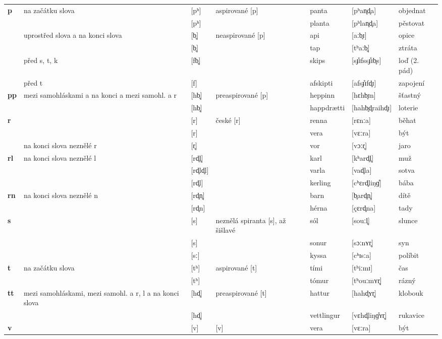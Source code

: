 \begin{longtable}{>{\bfseries}lX>{\IPAfont}lXl>{\IPAfont}ll}
p & na začátku slova & {[pʰ]} & aspirované [p] & panta & {[pʰan̥d̥a]} & objednat \\ 
 &  & {[pʰ]} &   & planta & {[pʰlan̥d̥a]} & pěstovat \\ 
 & uprostřed slova a na konci slova & {[b̥]} & neaspirované [p] & api & {[aːb̥ɪ]} & opice \\ 
 &  & {[b̥]} &   & tap & {[tʰaːb̥]} & ztráta \\ 
 & před s, t, k & {[fb̥]} &  & skips & {[s\r ɟɪfss\r ɟɪb̥s]} & loď (2. pád) \\ 
 & před t & {[f]} &   & afskipti & {[afs\r ɟɪfd̥ɪ]} & zapojení \\ 
pp & mezi samohláskami a na konci a mezi samohl. a r & {[hb̥]} & preaspirované [p] & heppinn & {[hɛhb̥ɪn]} & šťastný \\ 
 &  & {[hb̥]} &   & happdrætti & {[hahb̥d̥raihd̥ɪ]} & loterie \\ 
r &  & {[r]} & české [r] & renna & {[rɛnːa]} & běhat \\ 
 &  & {[r]} &   & vera & {[vɛːra]} & být \\ 
 & na konci slova neznělé r & {[r̥]} &   & vor & {[vɔːr̥]} & jaro \\ 
rl & na konci slova neznělé l & {[rd̥l̥]} &  & karl & {[kʰard̥l̥]} & muž \\ 
 &  & {[rd̥ld̥l]} &   & varla & {[vad̥la]} & sotva \\ 
 &  & {[rd̥l]} &   & kerling & {[cʰɛrd̥liŋɡ̊]} & bába \\ 
rn & na konci slova neznělé n & {[rd̥n̥]} &  & barn & {[b̥ard̥n̥]} & dítě \\ 
 &  & {[rd̥n]} &   & hérna & {[çɛrd̥na]} & tady \\ 
s &  & {[s]} & neznělá spiranta [s], až šišlavé & sól & {[souːl̥]} & slunce \\ 
 &  & {[s]} &   & sonur & {[sɔːnʏr̥]} & syn \\ 
 &  & {[sː]} &   & kyssa & {[cʰɪsːa]} & políbit \\ 
t & na začátku slova & {[tʰ]} & aspirované [t] & tími & {[tʰiːmɪ]} & čas \\ 
 &  & {[tʰ]} &   & tómur & {[tʰouːmʏr̥]} & rázný \\ 
tt & mezi samohláskami, mezi samohl. a r, l a na konci slova & {[hd̥]} & preaspirované [t] & hattur & {[hahd̥ʏr̥]} & klobouk \\ 
 &  & {[hd̥]} &   & vettlingur & {[vɛhd̥liŋɡ̊ʏr̥]} & rukavice \\ 
v &  & {[v]} & [v] & vera  & {[vɛːra]} & být \\ 

\end{longtable}
